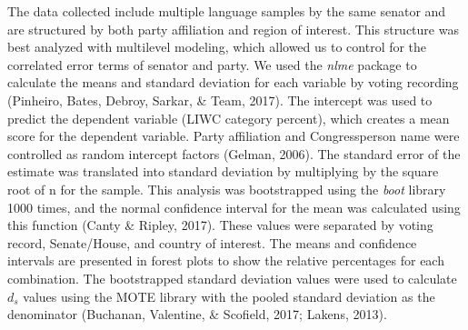 \documentclass[english,,man]{apa6}
\theoremstyle{definition}
\theoremstyle{definition}
\theoremstyle{definition}
\theoremstyle{remark}
\begin{document}
The data collected include multiple language samples by the same senator
and are structured by both party affiliation and region of interest.
This structure was best analyzed with multilevel modeling, which allowed
us to control for the correlated error terms of senator and party. We
used the \emph{nlme} package to calculate the means and standard
deviation for each variable by voting recording (Pinheiro, Bates,
Debroy, Sarkar, \& Team, 2017). The intercept was used to predict the
dependent variable (LIWC category percent), which creates a mean score
for the dependent variable. Party affiliation and Congressperson name
were controlled as random intercept factors (Gelman, 2006). The standard
error of the estimate was translated into standard deviation by
multiplying by the square root of n for the sample. This analysis was
bootstrapped using the \emph{boot} library 1000 times, and the normal
confidence interval for the mean was calculated using this function
(Canty \& Ripley, 2017). These values were separated by voting record,
Senate/House, and country of interest. The means and confidence
intervals are presented in forest plots to show the relative percentages
for each combination. The bootstrapped standard deviation values were
used to calculate \(d_s\) values using the MOTE library with the pooled
standard deviation as the denominator (Buchanan, Valentine, \& Scofield,
2017; Lakens, 2013).
\end{document}
